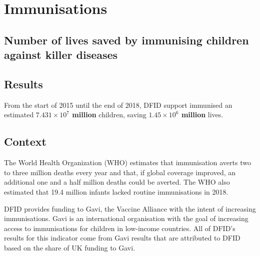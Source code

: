\chapter{Immunisations}

\section*{Number of lives saved by immunising children against killer diseases}


\thispagestyle{empty}



\section{Results}
From the start of 2015 until the end of 2018, DFID support immunised an estimated \textbf{
\ensuremath{7.431\times 10^{7}}
million} children, saving \textbf{
\ensuremath{1.45\times 10^{6}}
million} lives. %



\section{Context}

The World Health Organization (WHO) estimates that immunisation averts two to three million deaths every year and that, if global coverage improved, an additional one and a half million deaths could be averted. %
The WHO also estimated that 19.4 million infants lacked routine immunisations in 2018\footnotemark. \\%


DFID provides funding to Gavi, the Vaccine Alliance with the intent of increasing immunisations. %
Gavi is an international organisation with the goal of increasing access to immunisations for children in low-income countries. %
All of DFID's results for this indicator come from Gavi results that are attributed to DFID based on the share of UK funding to Gavi. %

\newpage
